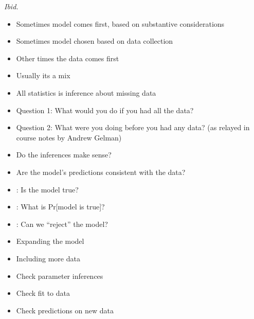 \documentclass[10pt]{report}
\begin{document}
\vfill\hfill {\footnotesize {\slshape Ibid.}}

\begin{itemize}
\item Sometimes model comes first, based on substantive
  considerations
\item Sometimes model chosen based on data collection
\item Other times the data comes first
\hfill
\item Usually its a mix
\end{itemize}

\begin{itemize}
\item All statistics is inference about missing data
\item Question 1: What would you do if you had all the data?
\item Question 2: What were you doing before you had any data?
\vfill
\hfill {\footnotesize (as relayed in course notes by Andrew Gelman)}
\end{itemize}

\begin{itemize}
\item Do the inferences make sense?
\item Are the model's predictions consistent with the data? 
\item {\slshape {}}: Is the model true?
\item {\slshape {}}: What is Pr[model is true]?
\item {\slshape {}}: Can we ``reject'' the model?
\vfill
\item Expanding the model
\item Including more data
\end{itemize}

\begin{itemize}
\item Check parameter inferences
\item Check fit to data
\item Check predictions on new data
\end{itemize}
\end{document}
